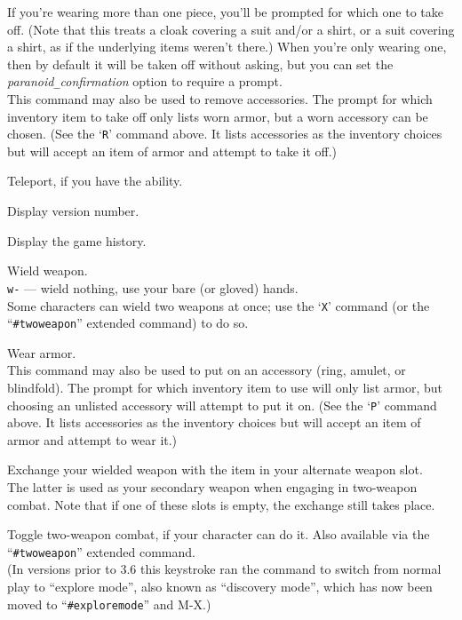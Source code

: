 If you're wearing more than one piece, you'll be prompted for which
one to take off.  (Note that this treats a cloak covering a suit
and/or a shirt, or a suit covering a shirt, as if the underlying items
weren't there.)
When you're only wearing one, then by default it will
be taken off without asking, but you can set the
{\it paranoid\verb+_+confirmation\/}
option to require a prompt.\\
This command may also be used to remove accessories.  The prompt
for which inventory item to take off only lists worn armor, but a worn
accessory can be chosen.
(See the `{\tt R}' command above.  It lists accessories as the inventory
choices but will accept an item of armor and attempt to take it off.)
\item[\tb{\^{}T}]
Teleport, if you have the ability.
\item[\tb{v}]
Display version number.
\item[\tb{V}]
Display the game history.
\item[\tb{w}]
Wield weapon.\\
{\tt w-} --- wield nothing, use your bare (or gloved) hands.\\
Some characters can wield two weapons at once; use the `{\tt X}' command
(or the ``{\tt \#twoweapon}'' extended command) to do so.
\item[\tb{W}]
Wear armor.\\
This command may also be used to put on an accessory (ring, amulet, or
blindfold).  The prompt for which inventory item to use will only list
armor, but choosing an unlisted accessory will attempt to put it on.
(See the `{\tt P}' command above.  It lists accessories as the inventory
choices but will accept an item of armor and attempt to wear it.)
\item[\tb{x}]
Exchange your wielded weapon with the item in your alternate weapon slot.\\
The latter is used as your secondary weapon when engaging in
two-weapon combat.  Note that if one of these slots is empty,
the exchange still takes place.
\item[\tb{X}]
Toggle two-weapon combat, if your character can do it.  Also available
via the ``{\tt \#twoweapon}'' extended command.\\
(In versions prior to 3.6 this keystroke ran the command to switch from normal
play to ``explore mode'', also known as ``discovery mode'', which has now
been moved to ``{\tt \#exploremode}'' and M-X.)
